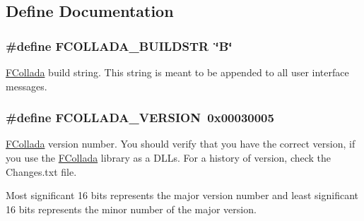 \subsection{Define Documentation}
\hypertarget{group__FCollada_gae93ce255d6017777d3a5f89bcb8e5eab}{
\subsubsection[{FCOLLADA\_\-BUILDSTR}]{\setlength{\rightskip}{0pt plus 5cm}\#define FCOLLADA\_\-BUILDSTR~\char`\"{}B\char`\"{}}}
\label{group__FCollada_gae93ce255d6017777d3a5f89bcb8e5eab}
\hyperlink{namespaceFCollada}{FCollada} build string. This string is meant to be appended to all user interface messages. \hypertarget{group__FCollada_ga8c605d8bc3b9e915e61fcfcf53754aac}{
\subsubsection[{FCOLLADA\_\-VERSION}]{\setlength{\rightskip}{0pt plus 5cm}\#define FCOLLADA\_\-VERSION~0x00030005}}
\label{group__FCollada_ga8c605d8bc3b9e915e61fcfcf53754aac}
\hyperlink{namespaceFCollada}{FCollada} version number. You should verify that you have the correct version, if you use the \hyperlink{namespaceFCollada}{FCollada} library as a DLLs. For a history of version, check the Changes.txt file.

Most significant 16 bits represents the major version number and least significant 16 bits represents the minor number of the major version. 